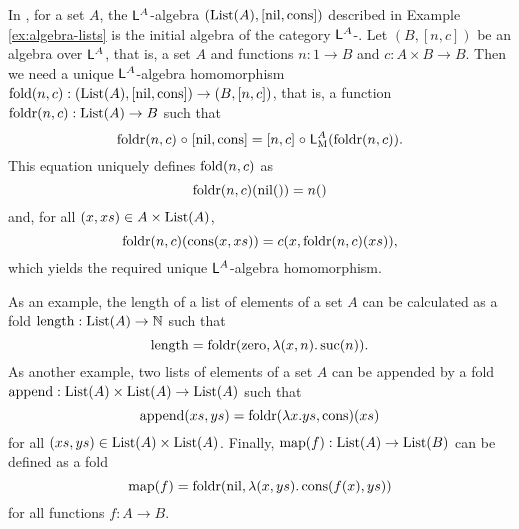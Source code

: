 \begin{example}

  \label{ex:initial-algebra-lists}


  In \set, for a set $A$, the $\mathsf{L}^{A}$-algebra
  $(\text{List}(A),[\operatorname{nil},\operatorname{cons}])$ described in Example
  \ref{ex:algebra-lists} is the initial algebra of the category
  $\mathsf{L}^{A}$-\alg. Let $(B,[n,c])$ be an algebra over
  $\mathsf{L}^{A}$, that is, a set $A$ and functions $n: 1 \to B$ and
  $c: A \times B \to B$. Then we need a unique $\mathsf{L}^{A}$-algebra
  homomorphism $\operatorname{fold}(n,c): (\text{List}(A),[\operatorname{nil},\operatorname{cons}]) \to (B,[n,c])$,
  that is, a function $\operatorname{foldr}(n,c): \text{List}(A) \to B$ such that
  \begin{equation*}
    \operatorname{foldr}(n,c) \mathrel{\circ} [\operatorname{nil},\operatorname{cons}] = [n,c] \mathrel{\circ} \mathsf{L}_{\operatorname{M}}^{A}(\operatorname{foldr}(n,c))
    \text{.}
  \end{equation*}
  This equation uniquely defines $\operatorname{fold}(n,c)$ as
  \begin{equation*}
    \operatorname{foldr}(n,c)(\operatorname{nil}()) = n()
  \end{equation*}
  and, for all $(x,xs) \in A \times \text{List}(A)$,
  \begin{equation*}
    \operatorname{foldr}(n,c)(\operatorname{cons}(x,xs)) = c(x,\operatorname{foldr}(n,c)(xs))
    \text{,}
  \end{equation*}
  which yields the required unique $\mathsf{L}^{A}$-algebra
  homomorphism.

  As an example, the length of a list of elements of a set $A$ can be
  calculated as a fold $\operatorname{length}: \text{List}(A) \to \mathbb{N}$ such that
  \begin{equation*}
    \operatorname{length} = \operatorname{foldr}(\operatorname{zero},\lambda(x,n).\operatorname{suc}(n))
    \text{.}
  \end{equation*}
  As another example, two lists of elements of a set $A$ can be
  appended by a fold $\operatorname{append}: \text{List}(A) \times \text{List}(A) \to
  \text{List}(A)$ such that
  \begin{equation*}
    \operatorname{append}(xs,ys) = \operatorname{foldr}(\lambda x.ys,\operatorname{cons})(xs)
  \end{equation*}
  for all $(xs,ys) \in \text{List}(A) \times \text{List}(A)$. Finally,
  $\operatorname{map}(f): \text{List}(A) \to \text{List}(B)$ can be defined as a fold
  \begin{equation*}
    \operatorname{map}(f) = \operatorname{foldr}(\operatorname{nil},\lambda(x,ys).\operatorname{cons}(f(x),ys))
  \end{equation*}
  for all functions $f: A \to B$.

\end{example}

